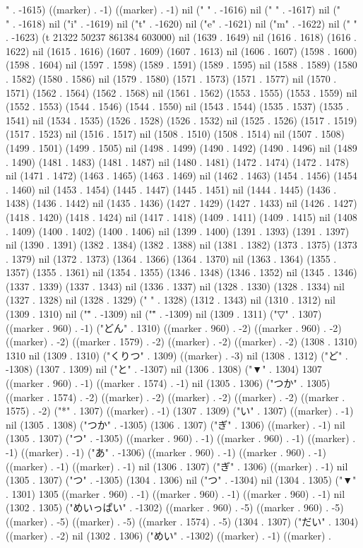 " . -1615) ((marker) . -1) ((marker) . -1) nil (" " . -1616) nil (" " . -1617) nil ("\\" . -1618) nil ("i" . -1619) nil ("t" . -1620) nil ("e" . -1621) nil ("m" . -1622) nil (" " . -1623) (t 21322 50237 861384 603000) nil (1639 . 1649) nil (1616 . 1618) (1616 . 1622) nil (1615 . 1616) (1607 . 1609) (1607 . 1613) nil (1606 . 1607) (1598 . 1600) (1598 . 1604) nil (1597 . 1598) (1589 . 1591) (1589 . 1595) nil (1588 . 1589) (1580 . 1582) (1580 . 1586) nil (1579 . 1580) (1571 . 1573) (1571 . 1577) nil (1570 . 1571) (1562 . 1564) (1562 . 1568) nil (1561 . 1562) (1553 . 1555) (1553 . 1559) nil (1552 . 1553) (1544 . 1546) (1544 . 1550) nil (1543 . 1544) (1535 . 1537) (1535 . 1541) nil (1534 . 1535) (1526 . 1528) (1526 . 1532) nil (1525 . 1526) (1517 . 1519) (1517 . 1523) nil (1516 . 1517) nil (1508 . 1510) (1508 . 1514) nil (1507 . 1508) (1499 . 1501) (1499 . 1505) nil (1498 . 1499) (1490 . 1492) (1490 . 1496) nil (1489 . 1490) (1481 . 1483) (1481 . 1487) nil (1480 . 1481) (1472 . 1474) (1472 . 1478) nil (1471 . 1472) (1463 . 1465) (1463 . 1469) nil (1462 . 1463) (1454 . 1456) (1454 . 1460) nil (1453 . 1454) (1445 . 1447) (1445 . 1451) nil (1444 . 1445) (1436 . 1438) (1436 . 1442) nil (1435 . 1436) (1427 . 1429) (1427 . 1433) nil (1426 . 1427) (1418 . 1420) (1418 . 1424) nil (1417 . 1418) (1409 . 1411) (1409 . 1415) nil (1408 . 1409) (1400 . 1402) (1400 . 1406) nil (1399 . 1400) (1391 . 1393) (1391 . 1397) nil (1390 . 1391) (1382 . 1384) (1382 . 1388) nil (1381 . 1382) (1373 . 1375) (1373 . 1379) nil (1372 . 1373) (1364 . 1366) (1364 . 1370) nil (1363 . 1364) (1355 . 1357) (1355 . 1361) nil (1354 . 1355) (1346 . 1348) (1346 . 1352) nil (1345 . 1346) (1337 . 1339) (1337 . 1343) nil (1336 . 1337) nil (1328 . 1330) (1328 . 1334) nil (1327 . 1328) nil (1328 . 1329) ("  " . 1328) (1312 . 1343) nil (1310 . 1312) nil (1309 . 1310) nil ("\"" . -1309) nil ("\"" . -1309) nil (1309 . 1311) ("▽" . 1307) ((marker . 960) . -1) ("どん" . 1310) ((marker . 960) . -2) ((marker . 960) . -2) ((marker) . -2) ((marker . 1579) . -2) ((marker) . -2) ((marker) . -2) (1308 . 1310) 1310 nil (1309 . 1310) ("くりつ" . 1309) ((marker) . -3) nil (1308 . 1312) ("ど" . -1308) (1307 . 1309) nil ("と" . -1307) nil (1306 . 1308) ("▼" . 1304) 1307 ((marker . 960) . -1) ((marker . 1574) . -1) nil (1305 . 1306) ("つか" . 1305) ((marker . 1574) . -2) ((marker) . -2) ((marker) . -2) ((marker) . -2) ((marker . 1575) . -2) ("*" . 1307) ((marker) . -1) (1307 . 1309) ("い" . 1307) ((marker) . -1) nil (1305 . 1308) ("つか" . -1305) (1306 . 1307) ("ぎ" . 1306) ((marker) . -1) nil (1305 . 1307) ("つ" . -1305) ((marker . 960) . -1) ((marker . 960) . -1) ((marker) . -1) ((marker) . -1) ("あ" . -1306) ((marker . 960) . -1) ((marker . 960) . -1) ((marker) . -1) ((marker) . -1) nil (1306 . 1307) ("ぎ" . 1306) ((marker) . -1) nil (1305 . 1307) ("つ" . -1305) (1304 . 1306) nil ("つ" . -1304) nil (1304 . 1305) ("▼" . 1301) 1305 ((marker . 960) . -1) ((marker . 960) . -1) ((marker . 960) . -1) nil (1302 . 1305) ("めいっぱい" . -1302) ((marker . 960) . -5) ((marker . 960) . -5) ((marker) . -5) ((marker) . -5) ((marker . 1574) . -5) (1304 . 1307) ("だい" . 1304) ((marker) . -2) nil (1302 . 1306) ("めい" . -1302) ((marker) . -1) ((marker) . 